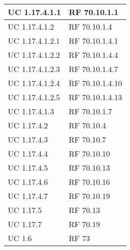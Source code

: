 {\begin{longtable} [c]{| p{4cm} | p{4cm} |}
 \hline 
UC 1.17.4.1.1 & RF 70.10.1.1\\ 
 \hline 
UC 1.17.4.1.2 & RF 70.10.1.4\\ 
 \hline 
UC 1.17.4.1.2.1 & RF 70.10.1.4.1\\ 
 \hline 
UC 1.17.4.1.2.2 & RF 70.10.1.4.4\\ 
 \hline 
UC 1.17.4.1.2.3 & RF 70.10.1.4.7\\ 
 \hline 
UC 1.17.4.1.2.4 & RF 70.10.1.4.10\\ 
 \hline 
UC 1.17.4.1.2.5 & RF 70.10.1.4.13\\ 
 \hline 
UC 1.17.4.1.3 & RF 70.10.1.7\\ 
 \hline 
UC 1.17.4.2 & RF 70.10.4\\ 
 \hline 
UC 1.17.4.3 & RF 70.10.7\\ 
 \hline 
UC 1.17.4.4 & RF 70.10.10\\ 
 \hline 
UC 1.17.4.5 & RF 70.10.13\\ 
 \hline 
UC 1.17.4.6 & RF 70.10.16\\ 
 \hline 
UC 1.17.4.7 & RF 70.10.19\\ 
 \hline 
UC 1.17.5 & RF 70.13\\ 
 \hline 
UC 1.17.7 & RF 70.19\\ 
 \hline 
UC 1.6 & RF 73\\ 
 \hline 
\end{longtable}}